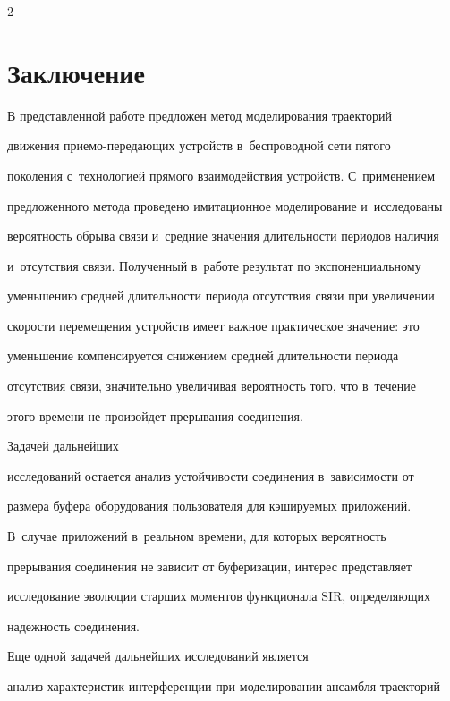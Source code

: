 \begin{multicols}{2}
\section{Заключение}





  В представленной работе предложен метод моделирования траекторий 


движения при\-емо-пе\-ре\-да\-ющих устройств в~беспроводной сети пятого 


поколения с~технологией прямого взаимодействия устройств. С~применением 


предложенного метода проведено имитационное моделирование и~исследованы 


вероятность обрыва связи и~средние значения длительности периодов наличия 


и~отсутствия связи. Полученный в~работе результат по экспоненциальному 


уменьшению средней длительности периода отсутствия связи при увеличении 


ско\-рости перемещения устройств имеет важное практическое значение: это 


уменьшение компенсируется снижением средней длительности периода 


отсутствия связи, значительно увеличивая вероятность того, что в~течение 


этого времени не произойдет прерывания со\-еди\-не\-ния. 





Задачей дальнейших 


исследований остается анализ устойчивости соединения в~зависимости от 


размера буфера оборудования пользователя для кэшируемых приложений. 





В~случае приложений в~реальном времени, для которых вероятность 


прерывания соединения не зависит от буферизации, интерес представляет 


исследование эволюции старших моментов функционала SIR, определяющих 


надежность соединения. 





Еще одной задачей дальнейших исследований является 


анализ характеристик интерференции при моделировании ансамбля траекторий 



\end{multicols}
